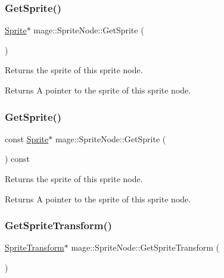 \subsubsection{\texorpdfstring{Get\+Sprite()}{GetSprite()}\hspace{0.1cm}{\footnotesize\ttfamily [1/2]}}
{\footnotesize\ttfamily \hyperlink{classmage_1_1_sprite}{Sprite}$\ast$ mage\+::\+Sprite\+Node\+::\+Get\+Sprite (\begin{DoxyParamCaption}{ }\end{DoxyParamCaption})\hspace{0.3cm}{\ttfamily [noexcept]}}

Returns the sprite of this sprite node.

\begin{DoxyReturn}{Returns}
A pointer to the sprite of this sprite node. 
\end{DoxyReturn}
\hypertarget{classmage_1_1_sprite_node_a585276a679d83576464014eeb156cf10}{}\label{classmage_1_1_sprite_node_a585276a679d83576464014eeb156cf10} 
\subsubsection{\texorpdfstring{Get\+Sprite()}{GetSprite()}\hspace{0.1cm}{\footnotesize\ttfamily [2/2]}}
{\footnotesize\ttfamily const \hyperlink{classmage_1_1_sprite}{Sprite}$\ast$ mage\+::\+Sprite\+Node\+::\+Get\+Sprite (\begin{DoxyParamCaption}{ }\end{DoxyParamCaption}) const\hspace{0.3cm}{\ttfamily [noexcept]}}

Returns the sprite of this sprite node.

\begin{DoxyReturn}{Returns}
A pointer to the sprite of this sprite node. 
\end{DoxyReturn}
\hypertarget{classmage_1_1_sprite_node_a99d90a2a337a45c0623022756c53f214}{}\label{classmage_1_1_sprite_node_a99d90a2a337a45c0623022756c53f214} 
\subsubsection{\texorpdfstring{Get\+Sprite\+Transform()}{GetSpriteTransform()}\hspace{0.1cm}{\footnotesize\ttfamily [1/2]}}
{\footnotesize\ttfamily \hyperlink{classmage_1_1_sprite_transform}{Sprite\+Transform}$\ast$ mage\+::\+Sprite\+Node\+::\+Get\+Sprite\+Transform (\begin{DoxyParamCaption}{ }\end{DoxyParamCaption})\hspace{0.3cm}{\ttfamily [noexcept]}}


